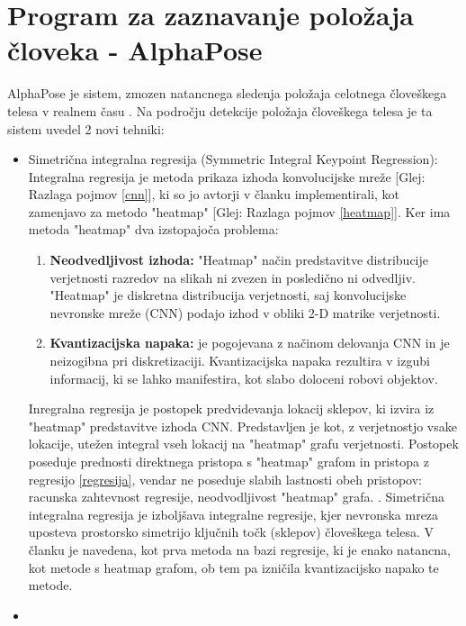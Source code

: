 \documentclass[a4paper,twoside,openright,12pt,slovene]{book}
\begin{document}
\section{Program za zaznavanje položaja človeka - AlphaPose} \label{AlphaPose}
AlphaPose je sistem, zmozen natancnega sledenja položaja celotnega človeškega telesa v realnem času \cite{AlphaPose_clanek}. Na področju detekcije položaja človeškega telesa je ta sistem uvedel 2 novi tehniki:
    \begin{itemize}
        \item  Simetrična integralna regresija (Symmetric Integral Keypoint Regression): Integralna regresija je metoda prikaza izhoda konvolucijske mreže [Glej: Razlaga pojmov \ref{cnn}], ki so jo avtorji v članku \cite{Sun_2018_ECCV} implementirali, kot zamenjavo za metodo "heatmap" [Glej: Razlaga pojmov \ref{heatmap}]. Ker ima metoda "heatmap" dva izstopajoča problema:
        \begin{enumerate}
            \item \textbf{Neodvedljivost izhoda:} "Heatmap" način predstavitve distribucije verjetnosti razredov na slikah ni zvezen in posledično ni odvedljiv. "Heatmap" je diskretna distribucija verjetnosti, saj konvolucijske nevronske mreže (CNN) podajo izhod v obliki 2-D matrike verjetnosti. \cite{Sun_2018_ECCV}

            \item \textbf{Kvantizacijska napaka:} je pogojevana z načinom delovanja CNN in je neizogibna pri diskretizaciji. Kvantizacijska napaka rezultira v izgubi informacij, ki se lahko manifestira, kot slabo doloceni robovi objektov. \cite{Sun_2018_ECCV}
        \end{enumerate}
        Inregralna regresija je postopek predvidevanja lokacij sklepov, ki izvira iz "heatmap" predstavitve izhoda CNN. Predstavljen je kot, z verjetnostjo vsake lokacije, utežen integral vseh lokacij na "heatmap" grafu verjetnosti. Postopek poseduje prednosti direktnega pristopa s "heatmap" grafom in pristopa z regresijo \ref{regresija}, vendar ne poseduje slabih lastnosti obeh pristopov: racunska zahtevnost regresije, neodvodljivost "heatmap" grafa. \cite{Sun_2018_ECCV}. Simetrična integralna regresija je izboljšava integralne regresije, kjer nevronska mreza uposteva prostorsko simetrijo ključnih točk (sklepov) človeškega telesa. V članku \cite{AlphaPose_clanek} je navedena, kot prva metoda na bazi regresije, ki je enako natancna, kot metode s heatmap grafom, ob tem pa izničila kvantizacijsko napako te metode.

        \item
        
    \end{itemize}
\end{document}
